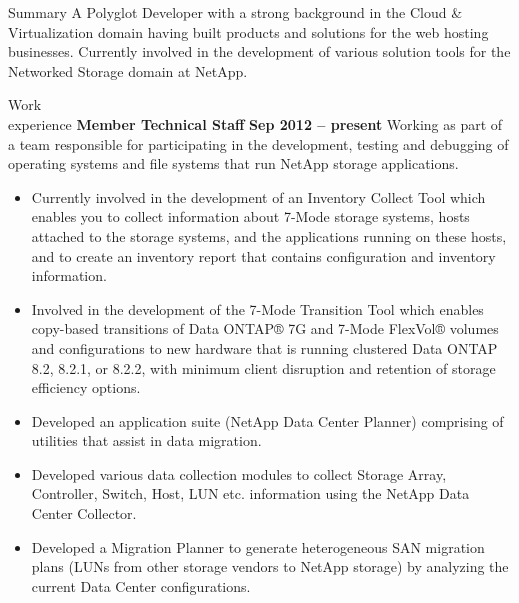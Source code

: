\documentclass{resume}
\author{Sreejith Kesavan}
\begin{document}
\maketitle

\begin{category}{Summary}
  \citemnobullet A Polyglot Developer with a strong background in the Cloud \& Virtualization 
  domain having built products and solutions for the web hosting businesses. 
  Currently involved in the development of various solution tools for the 
  Networked Storage domain at NetApp.
\end{category}


\begin{category}{Work \\experience}
  \citemnobullet \textbf{Member Technical Staff} \hfill \textbf{Sep 2012 -- present}
  \citemnobullet Working as part of a team responsible for participating in the development, 
  testing and debugging of operating systems and file systems that run NetApp storage applications.
  \begin{itemize}
  \item Currently involved in the development of an Inventory Collect Tool which enables you to collect
    information about 7-Mode storage systems, hosts attached to the storage systems, and the applications
    running on these hosts, and to create an inventory report that contains configuration and inventory
    information.
  \item Involved in the development of the 7-Mode Transition Tool which enables copy-based transitions of
    Data ONTAP® 7G and 7-Mode FlexVol® volumes and configurations to new hardware that is running clustered
    Data ONTAP 8.2, 8.2.1, or 8.2.2, with minimum client disruption and retention of storage efficiency options.
  \item Developed an application suite (NetApp Data Center Planner) comprising of utilities that 
    assist in data migration.
  \item Developed various data collection modules to collect Storage Array, Controller, Switch, Host, 
    LUN etc. information using the NetApp Data Center Collector.
  \item Developed a Migration Planner to generate heterogeneous SAN migration plans (LUNs from 
    other storage vendors to NetApp storage) by analyzing the current Data Center configurations.

\end{itemize}
\end{category}
\end{document}
